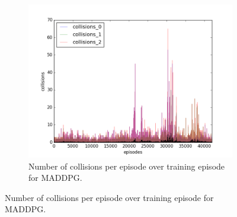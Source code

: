 \begin{figure}[h]
\begin{subfigure}[h]{\figscale\linewidth}
    \includegraphics[trim=10 10 10 10,clip,width=\linewidth]
    {../results/maddpg_1vs2/collisions.png}
    \caption{Number of collisions per episode over training episode for MADDPG.}
    \label{fig:maddpg-1vs2-collisions}
  \end{subfigure}


\end{figure}
